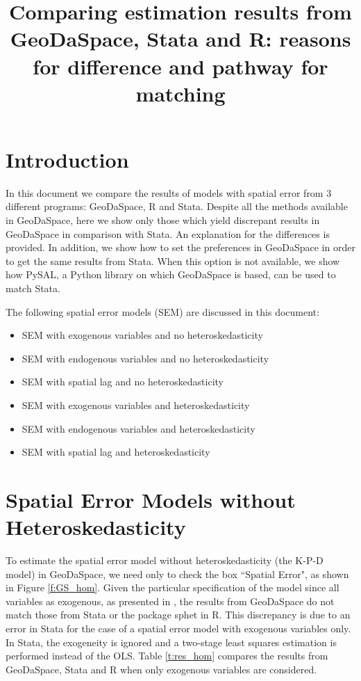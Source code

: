 \documentclass{article}
\title{Comparing estimation results from GeoDaSpace, Stata and R: reasons for difference and pathway for matching}
\author{}
\begin{document}
\maketitle
\section{Introduction}
In this document we compare the results of models with spatial error from 3 different programs: GeoDaSpace, R and Stata. Despite all the methods available in GeoDaSpace, here we show only those which yield discrepant results in GeoDaSpace in comparison with Stata. An explanation for the differences is provided. In addition, we show how to set the preferences in GeoDaSpace in order to get the same results from Stata. When this option is not available, we show how PySAL, a Python library on which GeoDaSpace is based, can be used to match Stata.

The following spatial error models (SEM) are discussed in this document:

\begin{itemize}
\item SEM with exogenous variables and no heteroskedasticity
\item SEM with endogenous variables and no heteroskedasticity
\item SEM with spatial lag and no heteroskedasticity
\item SEM with exogenous variables and heteroskedasticity
\item SEM with endogenous variables and heteroskedasticity
\item SEM with spatial lag and heteroskedasticity
\end{itemize}

\section{Spatial Error Models without Heteroskedasticity}

To estimate the spatial error model without heteroskedasticity (the K-P-D model) in GeoDaSpace, we need only to check the box ``Spatial Error", as shown in Figure \ref{f:GS_hom}. Given the particular specification of the model since all variables as exogenous, as presented in \citet{Anselin11}, the results from GeoDaSpace do not match those from Stata or the package sphet in R. This discrepancy is due to an error in Stata for the case of a spatial error model with exogenous variables only. In Stata, the exogeneity is ignored and a two-stage least squares estimation is performed instead of the OLS. Table \ref{t:res_hom} compares the results from GeoDaSpace, Stata and R when only exogenous variables are considered.
\end{document}
